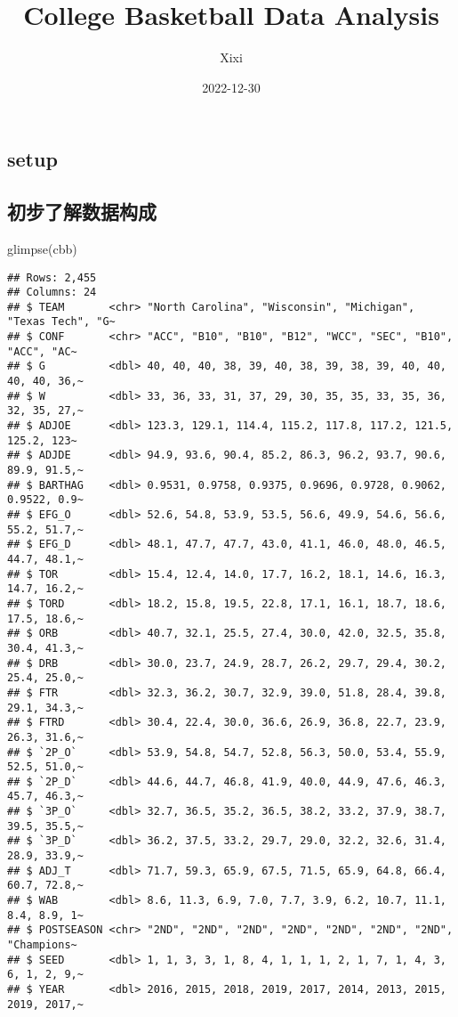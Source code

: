 \documentclass[
]{article}
\title{College Basketball Data Analysis}
\author{Xixi}
\date{2022-12-30}
\newenvironment{Shaded}{\begin{snugshade}}{\end{snugshade}}
\newcommand{\FunctionTok}[1]{\textcolor[rgb]{0.00,0.00,0.00}{#1}}
\newcommand{\NormalTok}[1]{#1}
\begin{document}
\maketitle

\hypertarget{setup}{%
\subsection{setup}\label{setup}}

\hypertarget{ux521dux6b65ux4e86ux89e3ux6570ux636eux6784ux6210}{%
\subsection{初步了解数据构成}\label{ux521dux6b65ux4e86ux89e3ux6570ux636eux6784ux6210}}

\begin{Shaded}
\begin{Highlighting}[]
\FunctionTok{glimpse}\NormalTok{(cbb)}
\end{Highlighting}
\end{Shaded}

\begin{verbatim}
## Rows: 2,455
## Columns: 24
## $ TEAM       <chr> "North Carolina", "Wisconsin", "Michigan", "Texas Tech", "G~
## $ CONF       <chr> "ACC", "B10", "B10", "B12", "WCC", "SEC", "B10", "ACC", "AC~
## $ G          <dbl> 40, 40, 40, 38, 39, 40, 38, 39, 38, 39, 40, 40, 40, 40, 36,~
## $ W          <dbl> 33, 36, 33, 31, 37, 29, 30, 35, 35, 33, 35, 36, 32, 35, 27,~
## $ ADJOE      <dbl> 123.3, 129.1, 114.4, 115.2, 117.8, 117.2, 121.5, 125.2, 123~
## $ ADJDE      <dbl> 94.9, 93.6, 90.4, 85.2, 86.3, 96.2, 93.7, 90.6, 89.9, 91.5,~
## $ BARTHAG    <dbl> 0.9531, 0.9758, 0.9375, 0.9696, 0.9728, 0.9062, 0.9522, 0.9~
## $ EFG_O      <dbl> 52.6, 54.8, 53.9, 53.5, 56.6, 49.9, 54.6, 56.6, 55.2, 51.7,~
## $ EFG_D      <dbl> 48.1, 47.7, 47.7, 43.0, 41.1, 46.0, 48.0, 46.5, 44.7, 48.1,~
## $ TOR        <dbl> 15.4, 12.4, 14.0, 17.7, 16.2, 18.1, 14.6, 16.3, 14.7, 16.2,~
## $ TORD       <dbl> 18.2, 15.8, 19.5, 22.8, 17.1, 16.1, 18.7, 18.6, 17.5, 18.6,~
## $ ORB        <dbl> 40.7, 32.1, 25.5, 27.4, 30.0, 42.0, 32.5, 35.8, 30.4, 41.3,~
## $ DRB        <dbl> 30.0, 23.7, 24.9, 28.7, 26.2, 29.7, 29.4, 30.2, 25.4, 25.0,~
## $ FTR        <dbl> 32.3, 36.2, 30.7, 32.9, 39.0, 51.8, 28.4, 39.8, 29.1, 34.3,~
## $ FTRD       <dbl> 30.4, 22.4, 30.0, 36.6, 26.9, 36.8, 22.7, 23.9, 26.3, 31.6,~
## $ `2P_O`     <dbl> 53.9, 54.8, 54.7, 52.8, 56.3, 50.0, 53.4, 55.9, 52.5, 51.0,~
## $ `2P_D`     <dbl> 44.6, 44.7, 46.8, 41.9, 40.0, 44.9, 47.6, 46.3, 45.7, 46.3,~
## $ `3P_O`     <dbl> 32.7, 36.5, 35.2, 36.5, 38.2, 33.2, 37.9, 38.7, 39.5, 35.5,~
## $ `3P_D`     <dbl> 36.2, 37.5, 33.2, 29.7, 29.0, 32.2, 32.6, 31.4, 28.9, 33.9,~
## $ ADJ_T      <dbl> 71.7, 59.3, 65.9, 67.5, 71.5, 65.9, 64.8, 66.4, 60.7, 72.8,~
## $ WAB        <dbl> 8.6, 11.3, 6.9, 7.0, 7.7, 3.9, 6.2, 10.7, 11.1, 8.4, 8.9, 1~
## $ POSTSEASON <chr> "2ND", "2ND", "2ND", "2ND", "2ND", "2ND", "2ND", "Champions~
## $ SEED       <dbl> 1, 1, 3, 3, 1, 8, 4, 1, 1, 1, 2, 1, 7, 1, 4, 3, 6, 1, 2, 9,~
## $ YEAR       <dbl> 2016, 2015, 2018, 2019, 2017, 2014, 2013, 2015, 2019, 2017,~
\end{verbatim}
\end{document}
